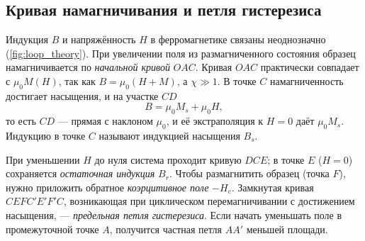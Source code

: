 \documentclass[a4paper,12pt]{article}
\begin{document}
\subsection{Кривая намагничивания и петля гистерезиса}
Индукция $B$ и напряжённость $H$ в ферромагнетике связаны неоднозначно
(\cref{fig:loop_theory}). При увеличении поля из размагниченного
состояния образец намагничивается по \emph{начальной кривой} $OAC$. Кривая
$OAC$ практически совпадает с $\mu_0 M(H)$, так как $B = \mu_0(H + M)$, а
$\chi \gg 1$. В точке $C$ намагниченность достигает насыщения, и на
участке $CD$
\begin{equation}
    \label{eq:sat}
    B = \mu_0 M_s + \mu_0 H ,
\end{equation}
то есть $CD$ --- прямая с наклоном $\mu_0$, и её экстраполяция к $H = 0$
даёт $\mu_0 M_s$. Индукцию в точке $C$ называют индукцией насыщения $B_s$.

При уменьшении $H$ до нуля система проходит кривую $DCE$; в точке $E$
($H = 0$) сохраняется \emph{остаточная индукция} $B_r$. Чтобы
размагнитить образец (точка $F$), нужно приложить обратное
\emph{коэрцитивное поле} $-H_c$. Замкнутая кривая $CEFC'E'F'C$,
возникающая при циклическом перемагничивании с достижением насыщения, ---
\emph{предельная петля гистерезиса}. Если начать уменьшать поле в
промежуточной точке $A$, получится частная петля $AA'$ меньшей площади.
\end{document}
